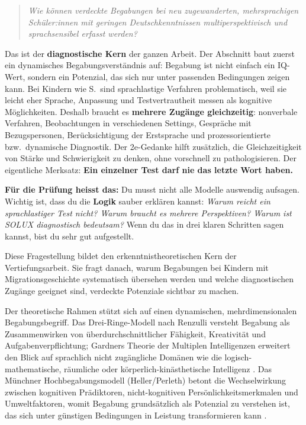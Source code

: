 \documentclass[ngerman, a4paper]{article}
\begin{document}
\begin{quote}\itshape
Wie können verdeckte Begabungen bei neu zugewanderten, mehrsprachigen
Schüler:innen mit geringen Deutschkenntnissen multiperspektivisch und
sprachsensibel erfasst werden?
\end{quote}

\begin{kapitelueberblick}
Das ist der \textbf{diagnostische Kern} der ganzen Arbeit. Der Abschnitt baut zuerst ein dynamisches Begabungsverständnis auf: Begabung ist nicht einfach ein IQ-Wert, sondern ein Potenzial, das sich nur unter passenden Bedingungen zeigen kann. Bei Kindern wie S.\ sind sprachlastige Verfahren problematisch, weil sie leicht eher Sprache, Anpassung und Testvertrautheit messen als kognitive Möglichkeiten. Deshalb braucht es \textbf{mehrere Zugänge gleichzeitig}: nonverbale Verfahren, Beobachtungen in verschiedenen Settings, Gespräche mit Bezugspersonen, Berücksichtigung der Erstsprache und prozessorientierte bzw.\ dynamische Diagnostik. Der 2e-Gedanke hilft zusätzlich, die Gleichzeitigkeit von Stärke und Schwierigkeit zu denken, ohne vorschnell zu pathologisieren. Der eigentliche Merksatz: \textbf{Ein einzelner Test darf nie das letzte Wort haben.}

\medskip\textbf{Für die Prüfung heisst das:} Du musst nicht alle Modelle auswendig aufsagen. Wichtig ist, dass du die \textbf{Logik} sauber erklären kannst: \textit{Warum reicht ein sprachlastiger Test nicht? Warum braucht es mehrere Perspektiven? Warum ist SOLUX diagnostisch bedeutsam?} Wenn du das in drei klaren Schritten sagen kannst, bist du sehr gut aufgestellt.
\end{kapitelueberblick}
 
Diese Fragestellung bildet den erkenntnistheoretischen Kern der Vertiefungsarbeit. Sie
fragt danach, warum Begabungen bei Kindern mit Migrationsgeschichte systematisch
übersehen werden und welche diagnostischen Zugänge geeignet sind, verdeckte Potenziale
sichtbar zu machen.
 
Der theoretische Rahmen stützt sich auf einen dynamischen, mehrdimensionalen
Begabungsbegriff. Das Drei-Ringe-Modell nach Renzulli versteht Begabung als
Zusammenwirken von überdurchschnittlicher Fähigkeit, Kreativität und Aufgabenverpflichtung;
Gardners Theorie der Multiplen Intelligenzen erweitert den Blick auf sprachlich
nicht zugängliche Domänen wie die logisch-mathematische, räumliche oder
körperlich-kinästhetische Intelligenz
\parencite{muelleroppliger2021handbuch,trautmann2016einfuehrung,preckel2013hochbegabung}.
Das Münchner Hochbegabungsmodell (Heller/Perleth) betont die Wechselwirkung
zwischen kognitiven Prädiktoren, nicht-kognitiven Persönlichkeitsmerkmalen und
Umweltfaktoren, womit Begabung grundsätzlich als Potenzial zu verstehen ist, das sich
unter günstigen Bedingungen in Leistung transformieren kann
\parencite{fischer2020begabungsfoerderung}.
 
\end{document}
